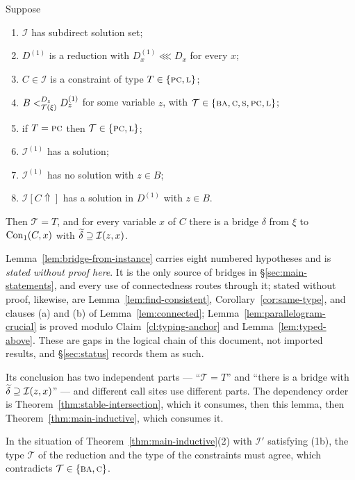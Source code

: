 \begin{longlemma}\label{lem:bridge-from-instance}
Suppose
\begin{enumerate}\romanlabels\tightlist
\item $\mathcal I$ has subdirect solution set;
\item $D^{(1)}$ is a reduction with $D^{(1)}_{x}\lll D_{x}$ for every $x$;
\item $C\in\mathcal I$ is a constraint of type $T\in\{\TPC,\TL\}$;
\item $B\subt[D_{z}]{\mathcal T(\xi)}D^{(1)}_{z}$ for some variable $z$, with
  $\mathcal T\in\{\TBA,\TC,\TS,\TPC,\TL\}$;
\item if $T=\TPC$ then $\mathcal T\in\{\TPC,\TL\}$;
\item $\mathcal I^{(1)}$ has a solution;
\item $\mathcal I^{(1)}$ has no solution with $z\in B$;
\item $\mathcal I[C\Uparrow]$ has a solution in $D^{(1)}$ with $z\in B$.
\end{enumerate}
Then $\mathcal T=T$, and for every variable $x$ of $C$ there is a bridge
$\delta$ from $\xi$ to $\ConOne(C,x)$ with
$\bcol{\delta}\supseteq\mathcal I(z,x)$.
\end{longlemma}

\begin{hazard}\label{haz:bridge-from-instance}
Lemma~\ref{lem:bridge-from-instance} carries eight numbered hypotheses and is
\emph{stated without proof here}. It is the only source of bridges in
\S\ref{sec:main-statements}, and every use of connectedness routes through it;
stated without proof, likewise, are Lemma~\ref{lem:find-consistent},
Corollary~\ref{cor:same-type}, and clauses
(a) and (b) of Lemma~\ref{lem:connected};
Lemma~\ref{lem:parallelogram-crucial} is proved modulo
Claim~\ref{cl:typing-anchor} and Lemma~\ref{lem:typed-above}. These are gaps
in the logical chain of this document, not imported results, and
\S\ref{sec:status} records them as such.

Its conclusion has two independent parts --- ``$\mathcal T=T$'' and ``there is a
bridge with $\bcol\delta\supseteq\mathcal I(z,x)$'' --- and different call
sites use different parts. The dependency order is
Theorem~\ref{thm:stable-intersection}, which it consumes, then this lemma, then
Theorem~\ref{thm:main-inductive}, which consumes it.
\end{hazard}

\begin{corollary}\label{cor:same-type}
In the situation of Theorem~\ref{thm:main-inductive}(2) with $\mathcal I'$
satisfying (1b), the type $\mathcal T$ of the reduction and the type of the
constraints must agree, which contradicts $\mathcal T\in\{\TBA,\TC\}$.
\end{corollary}
